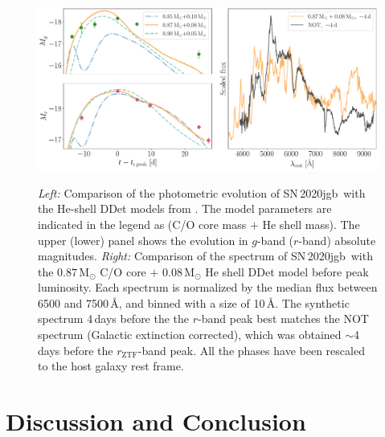 \documentclass[twocolumn]{aastex631}
\newcommand{\sn}{SN\,2020jgb}
\begin{document}
\begin{figure}
    \centering
    \includegraphics[width=\textwidth]{model.pdf}
    \label{fig:model}
    \caption{{\it Left:} Comparison of the photometric evolution of \sn\ with the He-shell DDet models from \citet{polin_observational_2019}. The model parameters are indicated in the legend as (C/O core mass $+$ He shell mass). The upper (lower) panel shows the evolution in $g$-band ($r$-band) absolute magnitudes. {\it Right:} Comparison of the spectrum of \sn\ with the $0.87\,\mathrm{M_\odot}$ C/O core $+$ $0.08\,\mathrm{M_\odot}$ He shell DDet model before peak luminosity. Each spectrum is normalized by the median flux between 6500 and 7500\,\r{A}, and binned with a size of 10\,\r{A}. The synthetic spectrum 4\,days before the the $r$-band peak best matches the NOT spectrum (Galactic extinction corrected), which was obtained $\sim$4\,days before the $r_\mathrm{ZTF}$-band peak. All the phases have been rescaled to the host galaxy rest frame. }
\end{figure}
\section{Discussion and Conclusion} \label{sec:discussion}

\facility{}


{}



\end{document}
